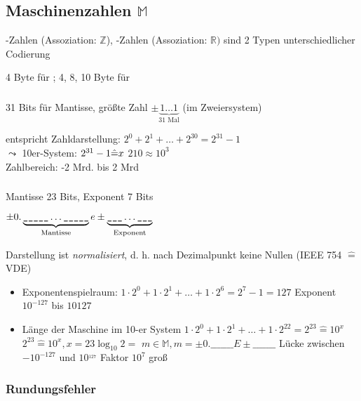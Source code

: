 \subsection{Maschinenzahlen $\mathbb{M}$}
\integer-Zahlen (Assoziation: $\mathbb{Z}$), \real-Zahlen (Assoziation: $\mathbb{R})$ sind 2 Typen unterschiedlicher Codierung

4 Byte für \integer; 4, 8, 10 Byte für \real

\subsubsection*{\integer}

31 Bits für Mantisse, größte Zahl $\pm \underbrace{1\ldots1}_{31\text{ Mal}}$ (im Zweiersystem)

entspricht Zahldarstellung: $2^0+2^1+\ldots+2^{30}=2^{31}-1$ \\
$\leadsto$ 10er-System: $2^{31}-1 \hat{=} x$ $2{10}\approx 10^3$ \\
Zahlbereich: -2 Mrd. bis 2 Mrd

\subsubsection*{}

Mantisse 23 Bits, Exponent 7 Bits

$\pm 0.\underbrace{\text{\ttfamily\_\_\_\_\_}\ldots\text{\ttfamily\_\_\_\_\_}}_{\text{Mantisse}}e\pm\underbrace{\text{\ttfamily\_\_\_}\ldots\text{\ttfamily\_\_\_}}_{\text{Exponent}}$

Darstellung ist \emph{normalisiert}, d. h. nach Dezimalpunkt keine Nullen (IEEE 754 $\hat{=}$ VDE)


\begin{itemize}
 \item Exponentenspielraum: $1\cdot 2^0+1\cdot2^1+\ldots+1\cdot2^6 = 2^7 -1 = 127$
  Exponent $10^{-127}$ bis $10{127}$
 \item Länge der Maschine im 10-er System
$1\cdot 2^0+1\cdot2^1+\ldots+1\cdot2^22=2^{23} \hat{=} 10^x$
$2^{23}\hat{=}10^x, x=23 \log_10 2 = $
$m \in \mathbb{M}, m=\pm 0.\_\_\_\_\_\_\_E\pm \_\_\_\_\_\_\_$ Lücke zwischen $-10^{-127}$ und $10^{_127}$ Faktor $10^7$ groß
\end{itemize}

\subsubsection{Rundungsfehler}

